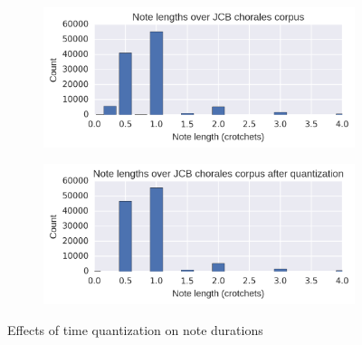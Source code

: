 \begin{figure}[tb]
    \centering
    \begin{subfigure}[t]{0.48\textwidth}
        \centering
        \includegraphics[width=1.0\linewidth]{note-lengths-original.png}
    \end{subfigure}
    \begin{subfigure}[t]{0.48\textwidth}
        \centering
        \includegraphics[width=1.0\linewidth]{note-lengths-quantized.png}
    \end{subfigure}
    \caption{Effects of time quantization on note durations}
    \label{fig:note-lengths-time-quantization}
\end{figure}


